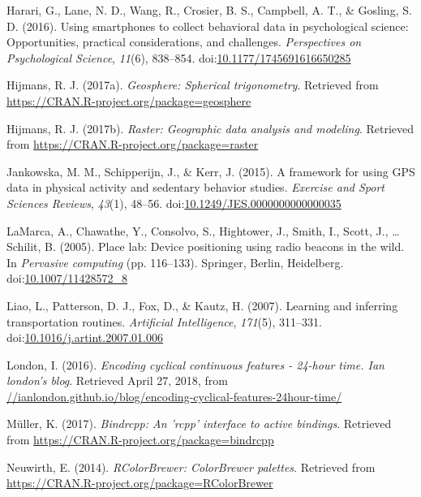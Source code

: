 \documentclass[man]{apa6}
\theoremstyle{definition}
\theoremstyle{definition}
\theoremstyle{definition}
\theoremstyle{remark}
\begin{document}
\hypertarget{ref-harari_using_2016}{}
Harari, G., Lane, N. D., Wang, R., Crosier, B. S., Campbell, A. T., \&
Gosling, S. D. (2016). Using smartphones to collect behavioral data in
psychological science: Opportunities, practical considerations, and
challenges. \emph{Perspectives on Psychological Science}, \emph{11}(6),
838--854.
doi:\href{https://doi.org/10.1177/1745691616650285}{10.1177/1745691616650285}

\hypertarget{ref-R-geosphere}{}
Hijmans, R. J. (2017a). \emph{Geosphere: Spherical trigonometry}.
Retrieved from \url{https://CRAN.R-project.org/package=geosphere}

\hypertarget{ref-R-raster}{}
Hijmans, R. J. (2017b). \emph{Raster: Geographic data analysis and
modeling}. Retrieved from
\url{https://CRAN.R-project.org/package=raster}

\hypertarget{ref-jankowska_framework_2015}{}
Jankowska, M. M., Schipperijn, J., \& Kerr, J. (2015). A framework for
using GPS data in physical activity and sedentary behavior studies.
\emph{Exercise and Sport Sciences Reviews}, \emph{43}(1), 48--56.
doi:\href{https://doi.org/10.1249/JES.0000000000000035}{10.1249/JES.0000000000000035}

\hypertarget{ref-lamarca_place_2005}{}
LaMarca, A., Chawathe, Y., Consolvo, S., Hightower, J., Smith, I.,
Scott, J., \ldots{} Schilit, B. (2005). Place lab: Device positioning
using radio beacons in the wild. In \emph{Pervasive computing} (pp.
116--133). Springer, Berlin, Heidelberg.
doi:\href{https://doi.org/10.1007/11428572_8}{10.1007/11428572\_8}

\hypertarget{ref-liao_learning_2007}{}
Liao, L., Patterson, D. J., Fox, D., \& Kautz, H. (2007). Learning and
inferring transportation routines. \emph{Artificial Intelligence},
\emph{171}(5), 311--331.
doi:\href{https://doi.org/10.1016/j.artint.2007.01.006}{10.1016/j.artint.2007.01.006}

\hypertarget{ref-london_encoding_2016}{}
London, I. (2016). \emph{Encoding cyclical continuous features - 24-hour
time. Ian london's blog}. Retrieved April 27, 2018, from
\url{//ianlondon.github.io/blog/encoding-cyclical-features-24hour-time/}

\hypertarget{ref-R-bindrcpp}{}
Müller, K. (2017). \emph{Bindrcpp: An 'rcpp' interface to active
bindings}. Retrieved from
\url{https://CRAN.R-project.org/package=bindrcpp}

\hypertarget{ref-R-RColorBrewer}{}
Neuwirth, E. (2014). \emph{RColorBrewer: ColorBrewer palettes}.
Retrieved from \url{https://CRAN.R-project.org/package=RColorBrewer}
\end{document}
